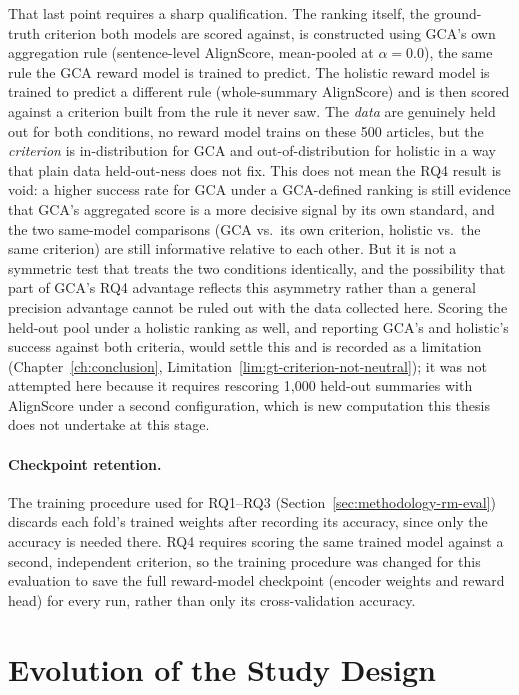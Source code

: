 That last point requires a sharp qualification. The ranking itself, the
ground-truth criterion both
models are scored against, is constructed using GCA's own aggregation rule
(sentence-level AlignScore, mean-pooled at $\alpha=0.0$), the same rule the
GCA reward model is trained to predict. The holistic reward model is
trained to predict a different rule (whole-summary AlignScore) and is then
scored against a criterion built from the rule it never saw. The
\emph{data} are genuinely held out for both conditions, no reward model
trains on these 500 articles, but the \emph{criterion} is in-distribution
for GCA and out-of-distribution for holistic in a way that plain data
held-out-ness does not fix. This does not mean the RQ4 result is void: a
higher success rate for GCA under a GCA-defined ranking is still evidence
that GCA's aggregated score is a more decisive signal by its own standard,
and the two same-model comparisons (GCA vs.\ its own criterion, holistic
vs.\ the same criterion) are still informative relative to each other. But
it is not a symmetric
test that treats the two conditions identically, and the possibility that
part of GCA's RQ4 advantage reflects this asymmetry rather than a general
precision advantage cannot be ruled out with the data collected here.
Scoring the held-out pool under a holistic ranking as well, and reporting
GCA's and holistic's success against both criteria, would settle this and
is recorded as a limitation
(Chapter~\ref{ch:conclusion}, Limitation~\ref{lim:gt-criterion-not-neutral}); it was not
attempted here because it requires rescoring 1{,}000 held-out summaries
with AlignScore under a second configuration, which is new computation
this thesis does not undertake at this stage.

\paragraph{Checkpoint retention.} The training procedure used for RQ1--RQ3
(Section~\ref{sec:methodology-rm-eval}) discards each fold's trained weights
after recording its accuracy, since only the accuracy is needed there. RQ4
requires scoring the same trained model against a second, independent
criterion, so the training procedure was changed for this evaluation to save
the full reward-model checkpoint (encoder weights and reward head) for every
run, rather than only its cross-validation accuracy.

\section{Evolution of the Study Design}
\label{sec:methodology-evolution}

